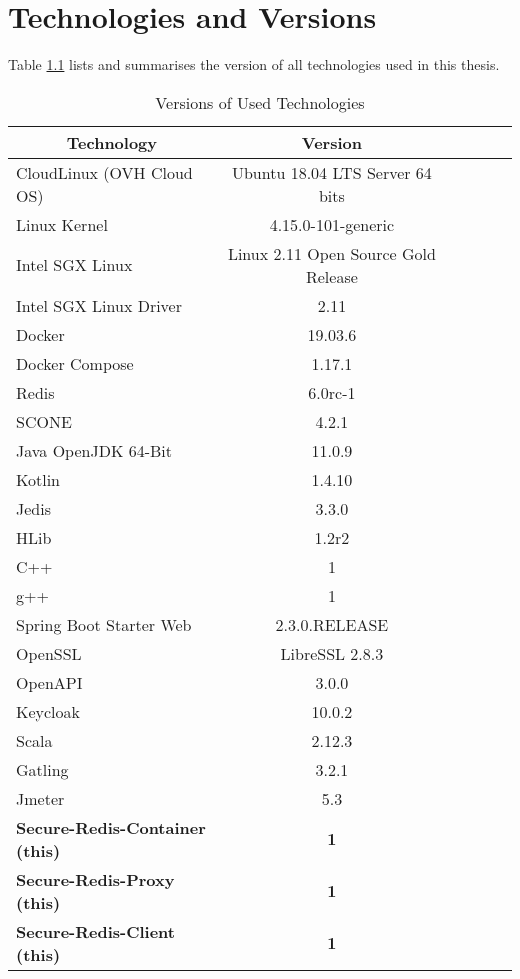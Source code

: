 \chapter{Technologies and Versions}
\label{ann:technologies_and_versions}

Table \ref{tab:versions_of_used_technologies} lists and summarises the version of all technologies used in this thesis.

\begin{table}[ht]
	\caption{Versions of Used Technologies}
	\label{tab:versions_of_used_technologies}
\centering
\begin{tabular}{lccccc}
	\toprule
	\multicolumn{1}{c}{\textbf{Technology}} 	& \multicolumn{1}{c}{\textbf{Version}} \\
	\midrule
		CloudLinux (OVH Cloud OS) 			& 		Ubuntu 18.04 LTS Server 64 bits 	\\
		Linux Kernel						&		4.15.0-101-generic					\\
		Intel SGX Linux						&		Linux 2.11 Open Source Gold Release \\
		Intel SGX Linux	Driver				&		2.11 								\\
		Docker								& 		19.03.6 								\\
		Docker Compose						& 		1.17.1 								\\
		Redis								& 		6.0rc-1 								\\
		SCONE 								& 		4.2.1 								\\
		Java OpenJDK 64-Bit 					& 		11.0.9								\\
		Kotlin 								& 		1.4.10								\\
		Jedis								&		3.3.0								\\
		HLib								&		1.2r2								\\
		C++									& 		1									\\
		g++									& 		1									\\
		Spring Boot Starter	Web				& 		2.3.0.RELEASE						\\
		OpenSSL								&		LibreSSL 2.8.3						\\
		OpenAPI								&		3.0.0								\\
		Keycloak							& 		10.0.2								\\
		Scala								& 		2.12.3								\\
		Gatling								& 		3.2.1								\\
		Jmeter								&		5.3									\\
	\midrule
	\textbf{Secure-Redis-Container (this)}	&		\textbf{1}							\\
	\textbf{Secure-Redis-Proxy (this)}		&		\textbf{1}							\\
	\textbf{Secure-Redis-Client	(this)}		&		\textbf{1}							\\
	\bottomrule
\end{tabular}
\end{table}
